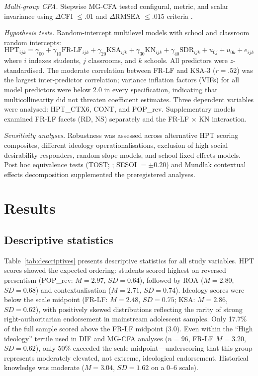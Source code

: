 \documentclass[pdflatex,sn-apa]{sn-jnl}%
\begin{document}
\emph{Multi-group CFA.} Stepwise MG-CFA tested configural, metric, and scalar invariance using $\Delta$CFI $\leq .01$ and $\Delta$RMSEA $\leq .015$ criteria \citep{Chen2007, Cheung2002}.

\emph{Hypothesis tests.} Random-intercept multilevel models with school and classroom random intercepts:
\begin{equation}\label{eq:model}
\text{HPT}_{ijk} = \gamma_{00} + \gamma_{10}\text{FR-LF}_{ijk} + \gamma_{20}\text{KSA}_{ijk} + \gamma_{30}\text{KN}_{ijk} + \gamma_{40}\text{SDR}_{ijk} + u_{0j} + u_{0k} + e_{ijk}
\end{equation}
where $i$ indexes students, $j$ classrooms, and $k$ schools. All predictors were $z$-standardised. The moderate correlation between FR-LF and KSA-3 ($r = .52$) was the largest inter-predictor correlation; variance inflation factors (VIFs) for all model predictors were below 2.0 in every specification, indicating that multicollinearity did not threaten coefficient estimates. Three dependent variables were analysed: HPT\_CTX6, CONT, and POP\_rev. Supplementary models examined FR-LF facets (RD, NS) separately and the FR-LF $\times$ KN interaction.

\emph{Sensitivity analyses.} Robustness was assessed across alternative HPT scoring composites, different ideology operationalisations, exclusion of high social desirability responders, random-slope models, and school fixed-effects models. Post hoc equivalence tests (TOST; \citealp{Lakens2017}; SESOI $= \pm 0.20$) and Mundlak contextual effects decomposition \citep{Mundlak1978} supplemented the preregistered analyses.


\section{Results}\label{sec:results}

\subsection{Descriptive statistics}\label{subsec:descriptives}

Table~\ref{tab:descriptives} presents descriptive statistics for all study variables. HPT scores showed the expected ordering: students scored highest on reversed presentism (POP\_rev: $M = 2.97$, $SD = 0.64$), followed by ROA ($M = 2.80$, $SD = 0.68$) and contextualisation ($M = 2.71$, $SD = 0.74$). Ideology scores were below the scale midpoint (FR-LF: $M = 2.48$, $SD = 0.75$; KSA: $M = 2.86$, $SD = 0.62$), with positively skewed distributions reflecting the rarity of strong right-authoritarian endorsement in mainstream adolescent samples. Only 17.7\% of the full sample scored above the FR-LF midpoint (3.0). Even within the ``High ideology'' tertile used in DIF and MG-CFA analyses ($n = 96$, FR-LF $M = 3.20$, $SD = 0.62$), only 50\% exceeded the scale midpoint---underscoring that this group represents moderately elevated, not extreme, ideological endorsement. Historical knowledge was moderate ($M = 3.04$, $SD = 1.62$ on a 0--6 scale).
\end{document}
